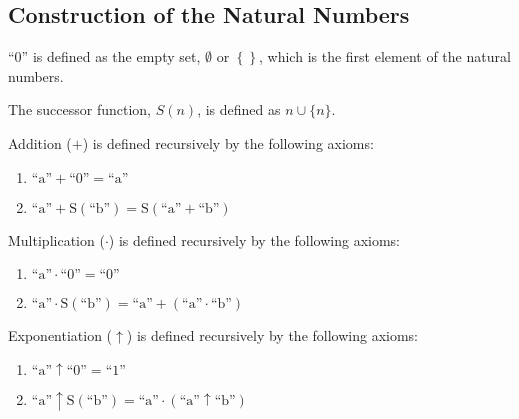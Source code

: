 \documentclass{article}
\DeclareMathOperator{\setunion}{\cup} %
\newcommand{\quo}[1]{\text{``}#1\text{''}}
\begin{document}
\subsection{Construction of the Natural Numbers}
\begin{definition}[\(\quo{0}\)]
    \(\quo{0}\) is defined as the empty set, \(\emptyset\) or \(\left\{\right\}\), which is the first element of the natural numbers.
\end{definition}
%
\begin{definition}
    The successor function, \(S(n)\), is defined as \(n \setunion \{n\}\).
\end{definition}
%
\begin{definition}[Addition]
    Addition (\(+\)) is defined recursively by the following axioms:
    \begin{enumerate}[label={(A\arabic*)}, leftmargin=3.5em, itemsep=0.2em, topsep=0.35em]
        \item \(\mathrm{\quo{a} + \quo{0} = \quo{a}}\)
        \item \(\mathrm{\quo{a} + S(\quo{b}) = S(\quo{a} + \quo{b})}\)
    \end{enumerate}
\end{definition}
%
\begin{definition}[Multiplication]
    Multiplication (\(\cdot\)) is defined recursively by the following axioms:
    \begin{enumerate}[label={(M\arabic*)}, leftmargin=3.5em, itemsep=0.2em, topsep=0.35em]
        \item \(\mathrm{\quo{a} \cdot \quo{0} = \quo{0}}\)
        \item \(\mathrm{\quo{a} \cdot S(\quo{b}) = \quo{a} + (\quo{a} \cdot \quo{b})}\)
    \end{enumerate}
\end{definition}
%
\begin{definition}[Exponentiation]
    Exponentiation (\(\uparrow\)) is defined recursively by the following axioms:
    \begin{enumerate}[label={(E\arabic*)}, leftmargin=3.5em, itemsep=0.2em, topsep=0.35em]
        \item \(\mathrm{\quo{a} \uparrow \quo{0} = \quo{1}}\)
        \item \(\mathrm{\quo{a} \uparrow S(\quo{b}) = \quo{a} \cdot (\quo{a} \uparrow \quo{b})}\)
    \end{enumerate}
\end{definition}
%
\end{document}
